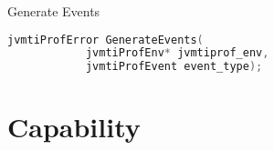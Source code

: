 \begin{apidef}{Generate Events}
\begin{lstlisting}[language=C]
jvmtiProfError GenerateEvents(
            jvmtiProfEnv* jvmtiprof_env,
            jvmtiProfEvent event_type);
\end{lstlisting}

\begin{apidesc}
\end{apidesc}

\begin{apiphase}
\end{apiphase}

\begin{apicap}
\end{apicap}

\begin{apiparam}
\end{apiparam}

\begin{apierror}
\end{apierror}
\end{apidef}
\fi

\section{Capability}

